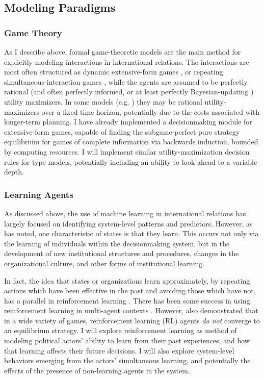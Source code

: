 \subsection{Modeling Paradigms}\label{modeling-paradigms}

\subsubsection{Game Theory}\label{game-theory}

As I describe above, formal game-theoretic models are the main method for explicitly modeling interactions in international relations. The interactions are most often structured as dynamic extensive-form games \citep{signorino_1999,bdm_1992}, or repeating simultaneous-interaction games \citep{slantchev_2003,bdm_2002}, while the agents are assumed to be perfectly rational (and often perfectly informed, or at least perfectly Bayesian-updating \citep{slantchev_2003}) utility maximizers. In some models (e.g. \citet{bdm_2002}) they may be rational utility-maximizers over a fixed time horizon, potentially due to the costs associated with longer-term planning. I have already implemented a decisionmaking module for extensive-form games, capable of finding the subgame-perfect pure strategy equilibrium for games of complete information via backwards induction, bounded by computing resources. I will implement similar utility-maximization decision rules for \citet{bdm_2002} type models, potentially including an ability to look ahead to a variable depth.

\subsubsection{Learning Agents}\label{learning-agents}

As discussed above, the use of machine learning in international relations has largely focused on identifying system-level patterns and predictors. However, as \citet{schrodt_2004} has noted, one characteristic of states is that they learn. This occurs not only via the learning of individuals within the decisionmaking system, but in the development of new institutional structures and procedures, changes in the organizational culture, and other forms of institutional learning.

In fact, the idea that states or organizations learn approximately, by repeating actions which have been effective in the past and avoiding those which have not, has a parallel in reinforcement learning \citep{sutton_1998}. There has been some success in using reinforcement learning in multi-agent contexts \citep{nowe_2012,littman_1994}. However, \citet{galla_2013} also demonstrated that in a wide variety of games, reinforcement learning (RL) agents \emph{do not} converge to an equilibrium strategy. I will explore reinforcement learning as method of modeling political actors' ability to learn from their past experiences, and how that learning affects their future decisions. I will also explore system-level behaviors emerging from the actors' simultaneous learning, and potentially the effects of the presence of non-learning agents in the system.

